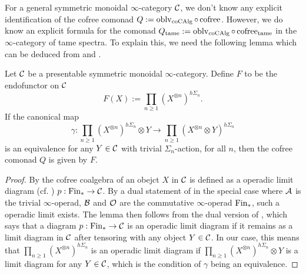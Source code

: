 For a general symmetric monoidal $\infty$-category ${\mathcal{C}}$, we don't know any explicit identification of the cofree comonad $Q:=\operatorname{oblv}_{\operatorname{coCAlg}}\circ \operatorname{cofree}$. 
However, we do know an explicit formula for the comonad $Q_{\operatorname{\operatorname{tame}}}:=\operatorname{oblv}_{\operatorname{coCAlg}}\circ \operatorname{cofree}_{\operatorname{\operatorname{tame}}}$ in the $\infty$-category of tame spectra. To explain this, we need the following lemma which can be deduced from \cite[Proposition 3.1.3.3]{HA} and \cite[Example 3.1.1.17]{HA}.
\begin{lemma}
\label{Cofree commutative coalgebra}
Let ${\mathcal{C}}$ be a presentable symmetric monoidal $\infty$-category.
Define $F$ to be the endofunctor on ${\mathcal{C}}$
$$
F(X):= \prod_{n\geq 1} (X^{\otimes n})^{h\Sigma_n}.
$$
If the canonical map 
$$
\gamma: \prod_{n\geq 1} (X^{\otimes n})^{h\Sigma_n} \otimes Y \to 
\prod_{n\geq 1} (X^{\otimes n} \otimes Y)^{h\Sigma_n}
$$
is an equivalence for any $Y\in {\mathcal{C}}$ with trivial $\Sigma_n$-action, for all $n$,
then the cofree comonad $Q$ is given by $F$.
\end{lemma}
\begin{proof}
    By \cite[Definition 3.1.3.1.]{HA} the cofree coalgebra of an obejct $X$ in ${\mathcal{C}}$ is defined as a operadic limit diagram (cf. \cite[Definition 3.1.1.2.]{HA}) $p:\operatorname{Fin}_{*} \to {\mathcal{C}}$.
    By a dual statement of \cite[Proposition 3.1.3.3]{HA} in the special case where ${\mathcal{A}}$ is the trivial $\infty$-operad, ${\mathcal{B}}$ and ${\mathcal{O}}$ are the commutative $\infty$-operad $\operatorname{Fin}_{*}$, such a operadic limit exists.
    The lemma then follows from the dual version of \cite[Example 3.1.1.17]{HA}, which says that a diagram $p:\operatorname{Fin}_{*} \to {\mathcal{C}}$ is an operadic limit diagram if it remains as a limit diagram in ${\mathcal{C}}$ after tensoring with any object $Y\in{\mathcal{C}}$. 
    In our case, this means that $\prod_{n\geq 1} (X^{\otimes n})^{h\Sigma_n}$ is an operadic limit diagram if 
    $\prod_{n\geq 1} (X^{\otimes n})^{h\Sigma_n} \otimes Y$ is a limit diagram for any $Y\in {\mathcal{C}}$, which is the condition of $\gamma$ being an equivalence.
    
\end{proof}

